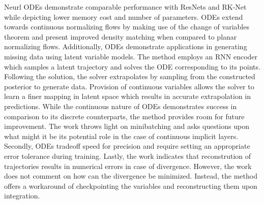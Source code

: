 \documentclass[11pt,letterpaper]{article}
\begin{document}
Neurl ODEs demonstrate comparable performance with ResNets and RK-Net while depicting lower memory cost and number of parameters. ODEs extend towards continuous normalizing flows by making use of the change of variables theorem and present improved density matching when compared to planar normalizing flows. Additionally, ODEs demonstrate applications in generating missing data using latent variable models. The method employs an RNN encoder which samples a latent trajectory and solves the ODE corresponding to its points. Following the solution, the solver extrapolates by sampling from the constructed posterior to generate data. Provision of continuous variables allows the solver to learn a finer mapping in latent space which results in accurate extrapolation in predictions. While the continuous nature of ODEs demonstrates success in comparison to its discrete counterparts, the method provides room for future improvement. The work throws light on minibatching and asks questions upon what might it be its potential role in the case of continuous implicit layers. Secondly, ODEs tradeoff speed for precision and require setting an appropriate error tolerance during training. Lastly, the work indicates that reconstrution of trajectories results in numerical errors in case of divergence. However, the work does not comment on how can the divergence be minimized. Instead, the method offers a workaround of checkpointing the variables and reconstructing them upon integration. 
\end{document}
